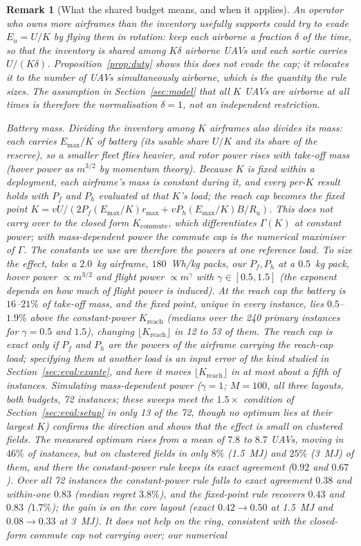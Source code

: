 \documentclass[journal,outdir=./]{IEEEtran}
\newtheorem{remark}{Remark}
\newcommand{\Kr}{K_{\mathrm{reach}}}
\newcommand{\Kc}{K_{\mathrm{commute}}}
\newcommand{\rmax}{r_{\max}}
\newcommand{\Pf}{P_{f}}
\newcommand{\Ph}{P_{h}}
\newcommand{\Emax}{E_{\max}}
\newcommand{\Eu}{E_{u}}
\newcommand{\Gam}{\Gamma}
\newcommand{\Ru}{R_u}
\begin{document}
\begin{remark}[What the shared budget means, and when it applies]
An operator who owns more airframes than the inventory usefully supports could try to evade $\Eu=U/K$ by flying them in rotation: keep each airborne a fraction $\delta$ of the time, so that the inventory is shared among $K\delta$ airborne UAVs and each sortie carries $U/(K\delta)$. Proposition~\ref{prop:duty} shows this does not evade the cap; it relocates it to the number of UAVs \emph{simultaneously airborne}, which is the quantity the rule sizes. The assumption in Section~\ref{sec:model} that all $K$ UAVs are airborne at all times is therefore the normalisation $\delta=1$, not an independent restriction.


\emph{Battery mass.} Dividing the inventory among $K$ airframes also divides its mass: each carries $\Emax/K$ of battery (its usable share $U/K$ and its share of the reserve), so a smaller fleet flies heavier, and rotor power rises with take-off mass (hover power as $m^{3/2}$ by momentum theory). Because $K$ is fixed within a deployment, each airframe's mass is constant during it, and every per-$K$ result holds with $\Pf$ and $\Ph$ evaluated at that $K$'s load; the reach cap becomes the fixed point $K=vU/(2\Pf(\Emax/K)\rmax+v\Ph(\Emax/K)B/\Ru)$. This does not carry over to the closed form $\Kc$, which differentiates $\Gam(K)$ at constant power; with mass-dependent power the commute cap is the numerical maximiser of $\Gam$. The constants we use are therefore the powers at one reference load. To size the effect, take a $2.0$~kg airframe, $180$~Wh/kg packs, our $\Pf,\Ph$ at a $0.5$~kg pack, hover power $\propto m^{3/2}$ and flight power $\propto m^{\gamma}$ with $\gamma\in[0.5,1.5]$ (the exponent depends on how much of flight power is induced). At the reach cap the battery is $16$--$21\%$ of take-off mass, and the fixed point, unique in every instance, lies $0.5$--$1.9\%$ above the constant-power $\Kr$ (medians over the 240 primary instances for $\gamma=0.5$ and $1.5$), changing $\lfloor\Kr\rfloor$ in 12 to 53 of them. The reach cap is exact only if $\Pf$ and $\Ph$ are the powers of the airframe carrying the reach-cap load; specifying them at another load is an input error of the kind studied in Section~\ref{sec:eval:exante}, and here it moves $\lfloor\Kr\rfloor$ in at most about a fifth of instances. Simulating mass-dependent power ($\gamma=1$; $M=100$, all three layouts, both budgets, 72 instances; these sweeps meet the $1.5\times$ condition of Section~\ref{sec:eval:setup} in only 13 of the 72, though no optimum lies at their largest $K$) confirms the direction and shows that the effect is small on clustered fields. The measured optimum rises from a mean of $7.8$ to $8.7$ UAVs, moving in $46\%$ of instances, but on clustered fields in only $8\%$ (1.5~MJ) and $25\%$ (3~MJ) of them, and there the constant-power rule keeps its exact agreement ($0.92$ and $0.67$). Over all 72 instances the constant-power rule falls to exact agreement $0.38$ and within-one $0.83$ (median regret $3.8\%$), and the fixed-point rule recovers $0.43$ and $0.83$ ($1.7\%$); the gain is on the core layout (exact $0.42\to0.50$ at 1.5~MJ and $0.08\to0.33$ at 3~MJ). It does not help on the ring, consistent with the closed-form commute cap not carrying over; our numerical 
\end{remark}
\end{document}
